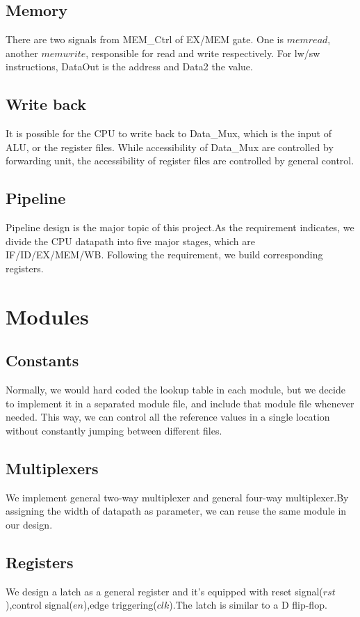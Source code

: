 \documentclass[11pt, a4paper]{article}
\begin{document}
\subsection{Memory}
\par There are two signals from MEM\_Ctrl of EX/MEM gate. One is $memread$, another $memwrite$, responsible for read and write respectively. For lw/sw instructions, DataOut is the address and Data2 the value.

\subsection{Write back}
It is possible for the CPU to write back to Data\_Mux, which is the input of ALU, or the register files. While accessibility of Data\_Mux are controlled by forwarding unit, the accessibility of register files are controlled by general control.

\subsection{Pipeline}
\par Pipeline design is the major topic of this project.As the requirement indicates, we divide the CPU datapath into five major stages, which are IF/ID/EX/MEM/WB. Following the requirement, we build corresponding registers.

\section{Modules}
\subsection{Constants}
Normally, we would hard coded the lookup table in each module, but we decide to implement it in a separated module file, and {\sc include} that module file whenever needed. This way, we can control all the reference values in a single location without constantly jumping between different files.


\subsection{Multiplexers}
We implement general two-way multiplexer and general four-way multiplexer.By assigning the width of datapath as parameter, we can reuse the same module in our design.

\subsection{Registers}
We design a latch as a general register and it's equipped with reset signal($rst$),control signal($en$),edge triggering($clk$).The latch is similar to a D flip-flop.
\end{document}
